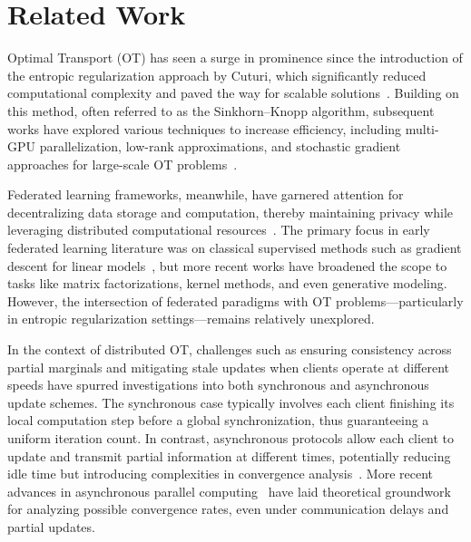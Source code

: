 \section{Related Work}
Optimal Transport (OT) has seen a surge in prominence since the introduction of the entropic regularization approach by Cuturi, which significantly reduced computational complexity and paved the way for scalable solutions~\cite{cuturi2013sinkhorn}. Building on this method, often referred to as the Sinkhorn–Knopp algorithm, subsequent works have explored various techniques to increase efficiency, including multi-GPU parallelization, low-rank approximations, and stochastic gradient approaches for large-scale OT problems~\cite{genevay2016stochastic, altschuler2019kmeans}. %

Federated learning frameworks, meanwhile, have garnered attention for decentralizing data storage and computation, thereby maintaining privacy while leveraging distributed computational resources~\cite{konecny2016federated}. The primary focus in early federated learning literature was on classical supervised methods such as gradient descent for linear models~\cite{mcmahan2017communication}, but more recent works have broadened the scope to tasks like matrix factorizations, kernel methods, and even generative modeling. However, the intersection of federated paradigms with OT problems—particularly in entropic regularization settings—remains relatively unexplored.

In the context of distributed OT, challenges such as ensuring consistency across partial marginals and mitigating stale updates when clients operate at different speeds have spurred investigations into both synchronous and asynchronous update schemes. The synchronous case typically involves each client finishing its local computation step before a global synchronization, thus guaranteeing a uniform iteration count. In contrast, asynchronous protocols allow each client to update and transmit partial information at different times, potentially reducing idle time but introducing complexities in convergence analysis~\cite{recht2011hogwild}. More recent advances in asynchronous parallel computing~\cite{lian2018asynchronous} have laid theoretical groundwork for analyzing possible convergence rates, even under communication delays and partial updates.

